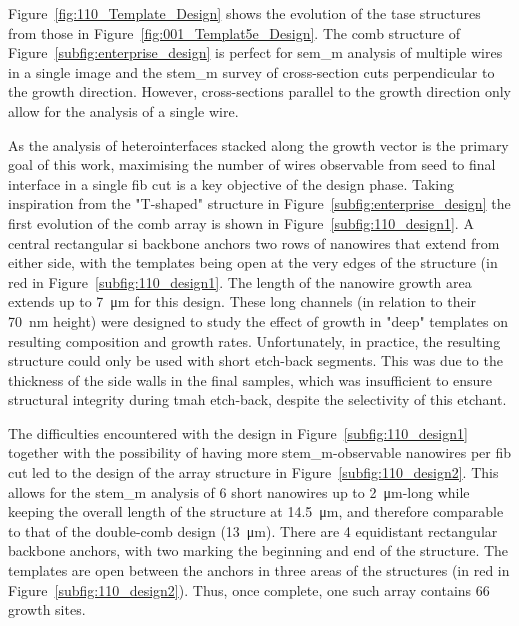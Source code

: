 Figure~\ref{fig:110_Template_Design} shows the evolution of the \acs{tase} structures from those in Figure~\ref{fig:001_Templat5e_Design}. The comb structure of Figure~\ref{subfig:enterprise_design} is perfect for \acf{sem_m} analysis of multiple wires in a single image and the \acf{stem_m} survey of cross-section cuts perpendicular to the growth direction. However, cross-sections parallel to the growth direction only allow for the analysis of a single wire.
\par
As the analysis of heterointerfaces stacked along the growth vector is the primary goal of this work, maximising the number of wires observable from seed to final interface in a single \acf{fib} cut is a key objective of the design phase. Taking inspiration from the "T-shaped" structure in Figure~\ref{subfig:enterprise_design} the first evolution of the comb array is shown in Figure~\ref{subfig:110_design1}. A central rectangular \acs{si} backbone anchors two rows of nanowires that extend from either side, with the templates being open at the very edges of the structure (in red in Figure~\ref{subfig:110_design1}. The length of the nanowire growth area extends up to \qty{7}{\micro\metre} for this design. These long channels (in relation to their \qty{70}{\nano\metre} height) were designed to study the effect of growth in "deep" templates on resulting composition and growth rates. Unfortunately, in practice, the resulting structure could only be used with short etch-back segments. This was due to the thickness of the side walls in the final samples, which was insufficient to ensure structural integrity during \acs{tmah} etch-back, despite the selectivity of this etchant.
\par
The difficulties encountered with the design in Figure~\ref{subfig:110_design1} together with the possibility of having more \acs{stem_m}-observable nanowires per \acs{fib} cut led to the design of the array structure in Figure~\ref{subfig:110_design2}. This allows for the \acs{stem_m} analysis of \num{6} short nanowires up to \qty{2}{\micro\metre}-long while keeping the overall length of the structure at \qty{14.5}{\micro\metre}, and therefore comparable to that of the double-comb design (\qty{13}{\micro\metre}). There are \num{4} equidistant rectangular backbone anchors, with two marking the beginning and end of the structure. The templates are open between the anchors in three areas of the structures (in red in Figure~\ref{subfig:110_design2}). Thus, once complete, one such array contains \num{66} growth sites.

